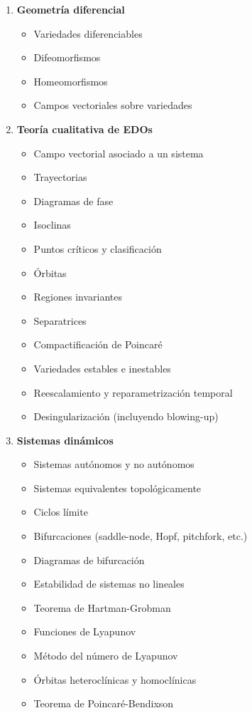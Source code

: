 \begin{enumerate}
	\item \textbf{Geometría diferencial}
	\begin{itemize}
		\item Variedades diferenciables
		\item Difeomorfismos
		\item Homeomorfismos
		\item Campos vectoriales sobre variedades
	\end{itemize}
	
	\item \textbf{Teoría cualitativa de EDOs}
	\begin{itemize}
		\item Campo vectorial asociado a un sistema \checkmark
		\item Trayectorias \checkmark
		\item Diagramas de fase \checkmark
		\item Isoclinas \checkmark
		\item Puntos críticos y clasificación \checkmark
		\item Órbitas
		\item Regiones invariantes
		\item Separatrices
		\item Compactificación de Poincaré
		\item Variedades estables e inestables
		\item Reescalamiento y reparametrización temporal
		\item Desingularización (incluyendo blowing-up)
	\end{itemize}
	
	\item \textbf{Sistemas dinámicos}
	\begin{itemize}
		\item Sistemas autónomos y no autónomos \checkmark
		\item Sistemas equivalentes topológicamente
		\item Ciclos límite
		\item Bifurcaciones (saddle-node, Hopf, pitchfork, etc.)
		\item Diagramas de bifurcación
		\item Estabilidad de sistemas no lineales
		\item Teorema de Hartman-Grobman \checkmark
		\item Funciones de Lyapunov
		\item Método del número de Lyapunov
		\item Órbitas heteroclínicas y homoclínicas
		\item Teorema de Poincaré-Bendixson
	\end{itemize}
	

\end{enumerate}
